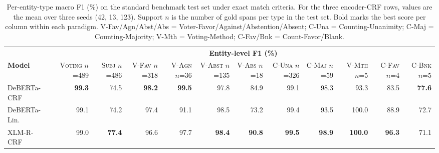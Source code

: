 \documentclass[11pt]{article}
\begin{document}
\begin{table}[ht!]
\centering
\footnotesize
\setlength{\tabcolsep}{4pt}
\caption{Per-entity-type macro F1 (\%) on the standard benchmark test set under exact match criteria. For the three encoder-CRF rows, values are the mean over three seeds (42, 13, 123). Support $n$ is the number of gold spans per type in the test set. Bold marks the best score per column within each paradigm. V-Fav/Agn/Abst/Abs = Voter-Favor/Against/Abstention/Absent; C-Una = Counting-Unanimity; C-Maj = Counting-Majority; V-Mth = Voting-Method; C-Fav/Bnk = Count-Favor/Blank.}
\label{tab:per_entity_f1}
\begin{tabular*}{\textwidth}{@{\extracolsep{\fill}} l rrrrrrrrrrr @{}}
\toprule
& \multicolumn{11}{c}{\textbf{Entity-level F1 (\%)}} \\
\cmidrule(lr){2-12}
\textbf{Model}
  & \makecell{\textsc{Voting}\\{\scriptsize $n$=489}}
  & \makecell{\textsc{Subj}\\{\scriptsize $n$=486}}
  & \makecell{\textsc{V-Fav}\\{\scriptsize $n$=318}}
  & \makecell{\textsc{V-Agn}\\{\scriptsize $n$=36}}
  & \makecell{\textsc{V-Abst}\\{\scriptsize $n$=135}}
  & \makecell{\textsc{V-Abs}\\{\scriptsize $n$=18}}
  & \makecell{\textsc{C-Una}\\{\scriptsize $n$=326}}
  & \makecell{\textsc{C-Maj}\\{\scriptsize $n$=59}}
  & \makecell{\textsc{V-Mth}\\{\scriptsize $n$=5}}
  & \makecell{\textsc{C-Fav}\\{\scriptsize $n$=4}}
  & \makecell{\textsc{C-Bnk}\\{\scriptsize $n$=5}} \\
\midrule
DeBERTa-CRF     & \textbf{99.3} & 74.5          & \textbf{98.2} & \textbf{99.5} & 97.8          & 84.9          & 99.1          & 98.3          & 93.3           & 83.5          & \textbf{77.6} \\
DeBERTa-Lin.    & 99.1          & 74.2          & 97.4          & 91.1          & 98.5          & 73.2          & 99.4          & 93.5          & 100.0          & 88.9          & 72.7          \\
XLM-R-CRF       & 99.0          & \textbf{77.4} & 96.6          & 97.7          & \textbf{98.4} & \textbf{90.8} & \textbf{99.5} & \textbf{98.9} & \textbf{100.0} & \textbf{96.3} & 71.1          \\

\end{tabular*}
\end{table}
\end{document}
